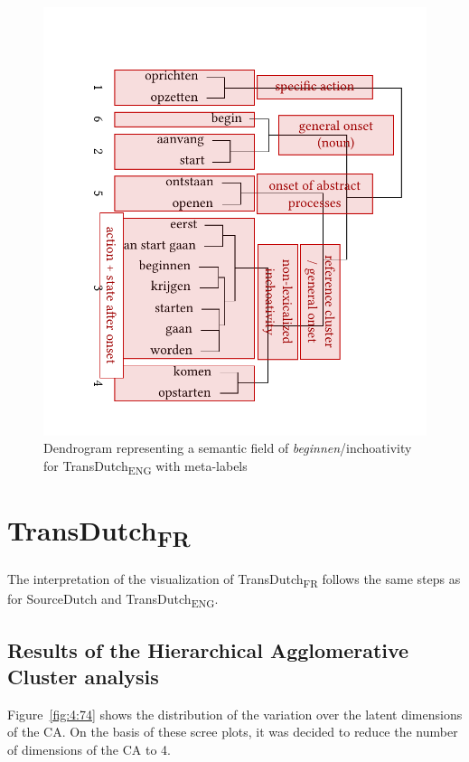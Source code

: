 \begin{figure}
\includegraphics[width=.75\textwidth,trim=0 20 0 50]{figures/tree75.pdf}
\caption{\label{fig:4:73}Dendrogram representing a semantic field of \textit{beginnen}/inchoativity for TransDutch\textsubscript{ENG} with meta-labels}
\end{figure}

\section{TransDutch\textsubscript{FR}}
\label{sec:4.4}  
The interpretation of the visualization of TransDutch\textsubscript{FR} follows the same steps as for SourceDutch and TransDutch\textsubscript{ENG}.

\subsection{Results of the Hierarchical Agglomerative Cluster analysis}
\label{sec:4.4.1}  
Figure~\ref{fig:4:74} shows the distribution of the variation over the latent dimensions of the CA. On the basis of these scree plots, it was decided to reduce the number of dimensions of the CA to 4.

